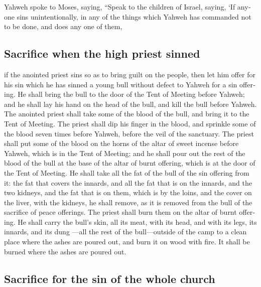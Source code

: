 \begin{paracol}{2}
\begin{otherlanguage}{english}
 Yahweh spoke to Moses, saying,  ``Speak to
the children of Israel, saying, `If anyone sins unintentionally, in any
of the things which Yahweh has commanded not to be done, and does any
one of them,

\hypertarget{sacrifice-when-the-high-priest-sinned}{%
\subsection{Sacrifice when the high priest
sinned}\label{sacrifice-when-the-high-priest-sinned}}

 if the anointed priest sins so as to bring guilt on the
people, then let him offer for his sin which he has sinned a young bull
without defect to Yahweh for a sin offering.  He shall
bring the bull to the door of the Tent of Meeting before Yahweh; and he
shall lay his hand on the head of the bull, and kill the bull before
Yahweh.  The anointed priest shall take some of the blood
of the bull, and bring it to the Tent of Meeting.  The
priest shall dip his finger in the blood, and sprinkle some of the blood
seven times before Yahweh, before the veil of the sanctuary.
 The priest shall put some of the blood on the horns of
the altar of sweet incense before Yahweh, which is in the Tent of
Meeting; and he shall pour out the rest of the blood of the bull at the
base of the altar of burnt offering, which is at the door of the Tent of
Meeting.  He shall take all the fat of the bull of the sin
offering from it: the fat that covers the innards, and all the fat that
is on the innards,  and the two kidneys, and the fat that
is on them, which is by the loins, and the cover on the liver, with the
kidneys, he shall remove,  as it is removed from the bull
of the sacrifice of peace offerings. The priest shall burn them on the
altar of burnt offering.  He shall carry the bull's skin,
all its meat, with its head, and with its legs, its innards, and its
dung  ---all the rest of the bull---outside of the camp
to a clean place where the ashes are poured out, and burn it on wood
with fire. It shall be burned where the ashes are poured out.

\hypertarget{sacrifice-for-the-sin-of-the-whole-church}{%
\subsection{Sacrifice for the sin of the whole
church}\label{sacrifice-for-the-sin-of-the-whole-church}}


\end{otherlanguage}
\end{paracol}
